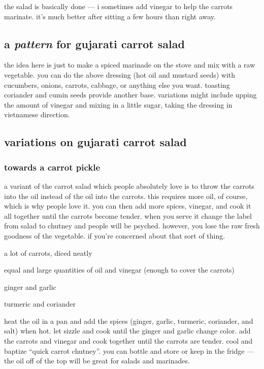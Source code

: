 the salad is basically done --- i sometimes add vinegar to help the carrots 
marinate. it's much better after sitting a few hours than right away.

\subsection{a \textit{pattern} for gujarati carrot salad}

the idea here is just to make a spiced marinade on the stove and mix with a raw 
vegetable. you can do the above dressing (hot oil and mustard seeds) with 
cucumbers, onions, carrots, cabbage, or anything else you want. toasting 
coriander and cumin seeds provide another base. variations might include upping 
the amount of vinegar and mixing in a little sugar, taking the dressing in 
vietnamese direction.

\subsection{variations on gujarati carrot salad}

\subsubsection{towards a carrot pickle}

a variant of the carrot salad which people absolutely love is to throw the 
carrots into the oil instead of the oil into the carrots. this requires more 
oil, of course, which is why people love it. you can then add more spices, 
vinegar, and cook it all together until the carrots become tender. when you 
serve it change the label from salad to chutney and people will be psyched. 
however, you lose the raw fresh goodness of the vegetable. if you're concerned 
about that sort of thing.

\begin{ingredients}
  \item a lot of carrots, diced neatly
  \item equal and large quantities of oil and vinegar (enough to cover the carrots)
  \item ginger and garlic
  \item turmeric and coriander
\end{ingredients}

heat the oil in a pan and add the spices (ginger, garlic, turmeric, coriander, 
and salt) when hot. let sizzle and cook until the ginger and garlic change 
color. add the carrots and vinegar and cook together until the carrots are 
tender. cool and baptize ``quick carrot chutney''. you can bottle and store or 
keep in the fridge --- the oil off of the top will be great for salads and 
marinades.
